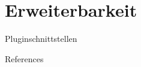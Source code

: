 \documentclass[18pt]{beamer}
\begin{document}
\section{Erweiterbarkeit}
\begin{frame}{Pluginschnittstellen}
\end{frame}
\appendix
\beginbackup

\begin{frame}[allowframebreaks]{References}

\end{frame}

\backupend
\end{document}
